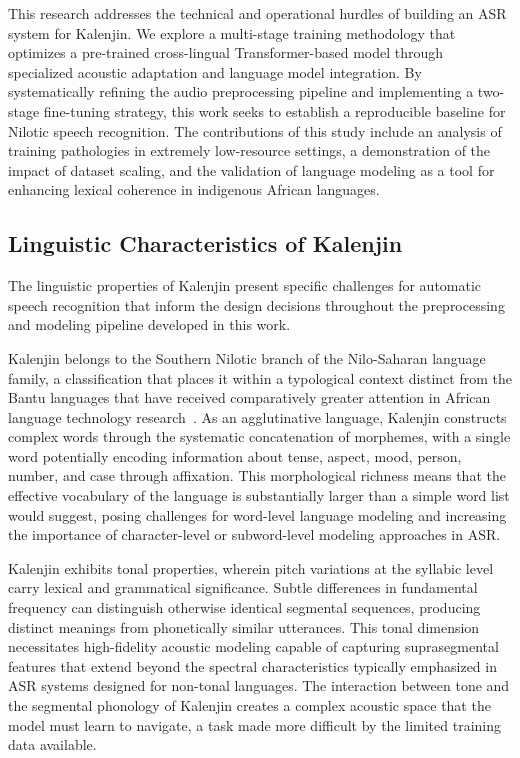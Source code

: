 \documentclass[journal]{IEEEtran}
\begin{document}
This research addresses the technical and operational hurdles of building an ASR system for Kalenjin. We explore a multi-stage training methodology that optimizes a pre-trained cross-lingual Transformer-based model through specialized acoustic adaptation and language model integration. By systematically refining the audio preprocessing pipeline and implementing a two-stage fine-tuning strategy, this work seeks to establish a reproducible baseline for Nilotic speech recognition. The contributions of this study include an analysis of training pathologies in extremely low-resource settings, a demonstration of the impact of dataset scaling, and the validation of language modeling as a tool for enhancing lexical coherence in indigenous African languages.

\subsection{Linguistic Characteristics of Kalenjin}

The linguistic properties of Kalenjin present specific challenges for automatic speech recognition that inform the design decisions throughout the preprocessing and modeling pipeline developed in this work.

Kalenjin belongs to the Southern Nilotic branch of the Nilo-Saharan language family, a classification that places it within a typological context distinct from the Bantu languages that have received comparatively greater attention in African language technology research~\cite{rottland1982southern}. As an agglutinative language, Kalenjin constructs complex words through the systematic concatenation of morphemes, with a single word potentially encoding information about tense, aspect, mood, person, number, and case through affixation. This morphological richness means that the effective vocabulary of the language is substantially larger than a simple word list would suggest, posing challenges for word-level language modeling and increasing the importance of character-level or subword-level modeling approaches in ASR.

Kalenjin exhibits tonal properties, wherein pitch variations at the syllabic level carry lexical and grammatical significance. Subtle differences in fundamental frequency can distinguish otherwise identical segmental sequences, producing distinct meanings from phonetically similar utterances. This tonal dimension necessitates high-fidelity acoustic modeling capable of capturing suprasegmental features that extend beyond the spectral characteristics typically emphasized in ASR systems designed for non-tonal languages. The interaction between tone and the segmental phonology of Kalenjin creates a complex acoustic space that the model must learn to navigate, a task made more difficult by the limited training data available.
\end{document}

